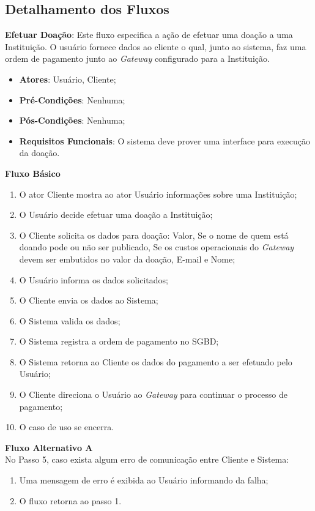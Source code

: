 \subsection*{Detalhamento dos Fluxos}
\begin{lista}
  \item \textbf{Efetuar Doação}: Este fluxo especifica a ação de efetuar uma doação a uma Instituição. O usuário fornece dados ao cliente o qual, junto ao sistema, faz uma ordem de pagamento junto ao \emph{Gateway} configurado para a Instituição.
    \begin{itemize}
    \item \textbf{Atores}: Usuário, Cliente;
    \item \textbf{Pré-Condições}: Nenhuma;
    \item \textbf{Pós-Condições}: Nenhuma;
    \item \textbf{Requisitos Funcionais}: O sistema deve prover uma interface para execução da doação.
    \end{itemize}
	
    \textbf{Fluxo Básico}
    \begin{enumerate}
    \item O ator Cliente mostra ao ator Usuário informações sobre uma Instituição;
    \item O Usuário decide efetuar uma doação a Instituição;
    \item O Cliente solicita os dados para doação: Valor, Se o nome de quem está doando pode ou não ser publicado, Se os custos operacionais do \emph{Gateway} devem ser embutidos no valor da doação, E-mail e Nome;
    \item O Usuário informa os dados solicitados;
    \item O Cliente envia os dados ao Sistema;
    \item O Sistema valida os dados;
    \item O Sistema registra a ordem de pagamento no SGBD;
    \item O Sistema retorna ao Cliente os dados do pagamento a ser efetuado pelo Usuário;
    \item O Cliente direciona o Usuário ao \emph{Gateway} para continuar o processo de pagamento;
    \item O caso de uso se encerra.
    \end{enumerate}
    
    \textbf{Fluxo Alternativo A} \\
    No Passo 5, caso exista algum erro de comunicação entre Cliente e Sistema:
    \begin{enumerate}
    \item Uma mensagem de erro é exibida ao Usuário informando da falha;
    \item O fluxo retorna ao passo 1.
    \end{enumerate}
    

\end{lista}
